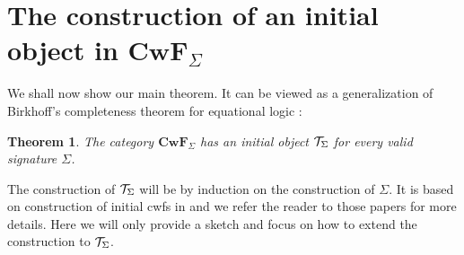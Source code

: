 \documentclass{lmcs}
\newtheorem{theorem}{Theorem}
\def\D{\mathcal{D}}
\def\Cwf{\mathbf{CwF}}
\begin{document}
%

\section{The construction of an initial object in $\Cwf_\Sigma$}

We shall now show our main theorem. It can be viewed as a generalization of Birkhoff's completeness theorem for equational logic \cite{birkhoff}:
\begin{theorem}
The category $\Cwf_\Sigma$ has an initial object ${\mathcal T}_\Sigma$ for every valid signature $\Sigma$.
\end{theorem}

The construction of ${\mathcal T}_\Sigma$ will be by induction on the construction of $\Sigma$. It is based on construction of initial cwfs in \cite{castellan:tlca2015,castellan:lmcs} and we refer the reader to those papers for more details. Here we will only provide a sketch and focus on how to extend the construction to ${\mathcal T}_\Sigma$.
\end{document}

